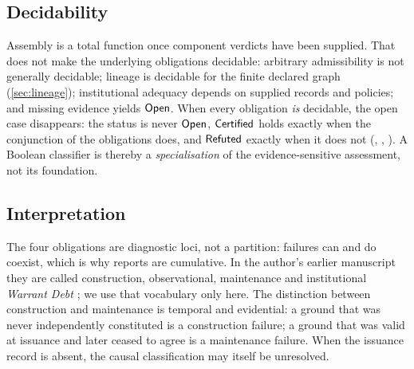 \subsection{Decidability}
Assembly is a total function once component verdicts have been supplied. That does not make the underlying obligations decidable: arbitrary admissibility is not generally decidable; lineage is decidable for the finite declared graph (\cref{sec:lineage}); institutional adequacy depends on supplied records and policies; and missing evidence yields $\mathsf{Open}$. When every obligation \emph{is} decidable, the open case disappears: the status is never $\mathsf{Open}$, $\mathsf{Certified}$ holds exactly when the conjunction of the obligations does, and $\mathsf{Refuted}$ exactly when it does not (, , ). A Boolean classifier is thereby a \emph{specialisation} of the evidence-sensitive assessment, not its foundation.

\subsection{Interpretation}
The four obligations are diagnostic loci, not a partition: failures can and do coexist, which is why reports are cumulative. In the author's earlier manuscript they are called construction, observational, maintenance and institutional \emph{Warrant Debt} \cite{moore2026}; we use that vocabulary only here. The distinction between construction and maintenance is temporal and evidential: a ground that was never independently constituted is a construction failure; a ground that was valid at issuance and later ceased to agree is a maintenance failure. When the issuance record is absent, the causal classification may itself be unresolved.
